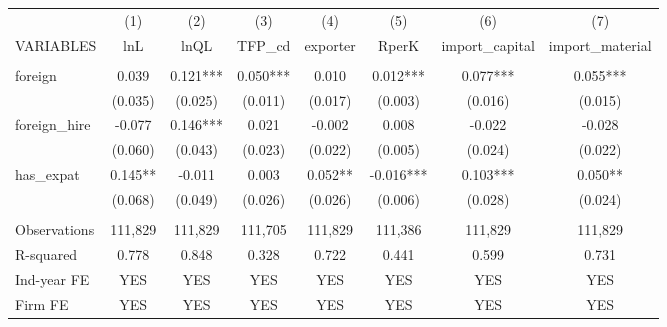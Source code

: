 \begin{tabular}{lccccccc} \hline
 & (1) & (2) & (3) & (4) & (5) & (6) & (7) \\
VARIABLES & lnL & lnQL & TFP\_cd & exporter & RperK & import\_capital & import\_material \\ \hline
 &  &  &  &  &  &  &  \\
foreign & 0.039 & 0.121*** & 0.050*** & 0.010 & 0.012*** & 0.077*** & 0.055*** \\
 & (0.035) & (0.025) & (0.011) & (0.017) & (0.003) & (0.016) & (0.015) \\
foreign\_hire & -0.077 & 0.146*** & 0.021 & -0.002 & 0.008 & -0.022 & -0.028 \\
 & (0.060) & (0.043) & (0.023) & (0.022) & (0.005) & (0.024) & (0.022) \\
has\_expat & 0.145** & -0.011 & 0.003 & 0.052** & -0.016*** & 0.103*** & 0.050** \\
 & (0.068) & (0.049) & (0.026) & (0.026) & (0.006) & (0.028) & (0.024) \\
 &  &  &  &  &  &  &  \\
Observations & 111,829 & 111,829 & 111,705 & 111,829 & 111,386 & 111,829 & 111,829 \\
R-squared & 0.778 & 0.848 & 0.328 & 0.722 & 0.441 & 0.599 & 0.731 \\
Ind-year FE & YES & YES & YES & YES & YES & YES & YES \\
 Firm FE & YES & YES & YES & YES & YES & YES & YES \\ \hline
\end{tabular}
